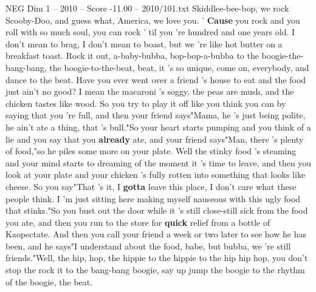 \begin{textsample}{NEG Dim 1 – 2010 – Score -11.00 – 2010/101.txt}
Skiddlee-bee-bop, we rock Scooby-Doo, and guess what, America, we love you. ' \textbf{Cause} you rock and you roll with so much soul, you can rock ' til you 're hundred and one years old.
I don't mean to brag, I don't mean to boast, but we 're like hot butter on a breakfast toast.
Rock it out, a-baby-bubba, bop-bop-a-bubba to the boogie-the-bang-bang, the boogie-to-the-beat, beat, it 's so unique, come on, everybody, and dance to the beat.
Have you ever went over a friend 's house to eat and the food just ain't no good?
I mean the macaroni 's soggy, the peas are mush, and the chicken tastes like wood.
So you try to play it off like you think you can by saying that you 're full, and then your friend says"Mama, he 's just being polite, he ain't ate a thing, that 's bull."So your heart starts pumping and you think of a lie and you say that you \textbf{already} ate, and your friend says"Man, there 's plenty of food,"so he piles some more on your plate.
Well the stinky food 's steaming and your mind starts to dreaming of the moment it 's time to leave, and then you look at your plate and your chicken 's fully rotten into something that looks like cheese.
So you say"That 's it, I \textbf{gotta} leave this place, I don't care what these people think.
I 'm just sitting here making myself nauseous with this ugly food that stinks."So you bust out the door while it 's still close-still sick from the food you ate, and then you run to the store for \textbf{quick} relief from a bottle of Kaopectate.
And then you call your friend a week or two later to see how he has been, and he says"I understand about the food, babe, but bubba, we 're still friends."Well, the hip, hop, the hippie to the hippie to the hip hip hop, you don't stop the rock it to the bang-bang boogie, say up jump the boogie to the rhythm of the boogie, the beat.

\end{textsample}
